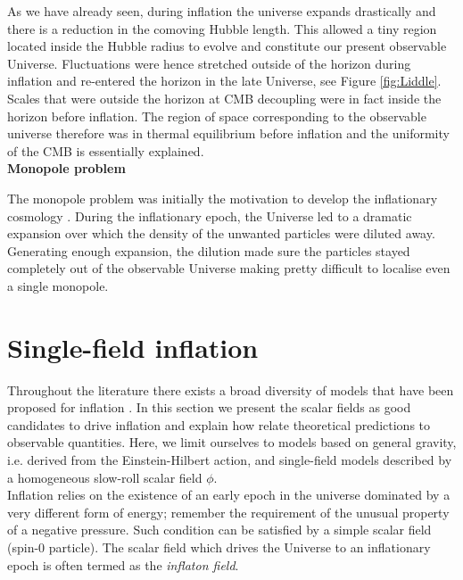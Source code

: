\documentclass{rmaa}
\begin{document}
As we have already seen, during inflation the universe expands drastically and there is a 
reduction in the comoving Hubble length. This allowed a tiny region located inside the 
Hubble radius to evolve and constitute our present observable Universe. 
Fluctuations were hence stretched outside of the horizon during inflation and re-entered the horizon 
in the late Universe, see Figure \ref{fig:Liddle}. Scales that were outside the horizon at CMB decoupling 
were in fact inside the horizon before inflation. The region of space corresponding to the 
observable universe therefore was in thermal equilibrium before inflation and the uniformity 
of the CMB is essentially explained.
\\


\vskip 16pt
\noindent
\textbf{Monopole problem}
\vskip 6pt

The monopole problem was initially the motivation to develop the inflationary
cosmology \citep{Guth2}.
%
During the inflationary epoch, the Universe led to a dramatic expansion
over which the density of the unwanted particles were diluted away. Generating enough
expansion, the dilution made sure the particles stayed completely out of the observable Universe
making pretty difficult to localise even a single monopole.     





\section{Single-field inflation}
\vskip 6pt


Throughout the literature there exists a broad diversity of models that have been proposed for inflation 
\citep{LiddleLyth, Olive, Lyth}. In this section we present the scalar fields as good candidates 
to drive inflation and explain how relate theoretical predictions to observable quantities. 
Here, we limit ourselves to models based on general gravity, i.e. derived from the
Einstein-Hilbert action, and single-field models described by a homogeneous slow-roll scalar field $\phi$.
\\

Inflation relies on the existence of an early epoch in the universe dominated by a very 
different form of energy; remember the requirement of the unusual property of a negative 
pressure. Such condition can be satisfied by a simple scalar field (spin-0 particle). 
The scalar field which drives the Universe to an inflationary epoch is often termed 
as the \textit{inflaton field}. 
%
\end{document}
